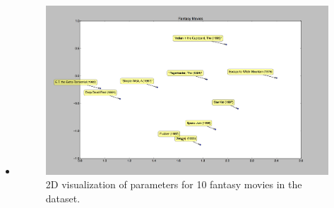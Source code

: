 \begin{itemize}
    \pagebreak
    \item {}

    \begin{figure}[H]
    \centering
    \includegraphics[width=\textwidth]{fantasy_2d_vis}
    \caption{2D visualization of parameters for 10 fantasy movies in the dataset.}
    \end{figure}




\end{itemize}







